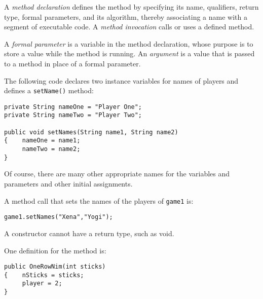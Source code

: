 \secANSH
\begin{ANS}
\item  A {\it method declaration} defines the method by specifying
its name, qualifiers, return type, formal parameters, and
its algorithm, thereby associating a name with a segment
of executable code.  A {\it method invocation} calls or
uses a defined method.


\item  A {\it formal parameter} is a variable in the method declaration,
whose purpose is to store a value while the method is running.  An
{\it argument} is a value that is passed to a method in place of a
formal parameter.


\item  The following code declares two instance variables for names
of players  and defines a {\tt setName()} method:

\begin{jjjlisting}
\begin{lstlisting}
private String nameOne = "Player One";
private String nameTwo = "Player Two";

public void setNames(String name1, String name2)
{    nameOne = name1;
     nameTwo = name2;
}
\end{lstlisting}
\end{jjjlisting}

\noindent Of course, there are many other appropriate names for
the variables and parameters and other initial assignments.

\item A method call that sets the names of the players of {\tt game1} is:

\begin{jjjlisting}
\begin{lstlisting}
game1.setNames("Xena","Yogi");
\end{lstlisting}
\end{jjjlisting}

\item  A constructor cannot have a return type, such as void.

\item  One definition for the method is:

\begin{jjjlisting}
\begin{lstlisting}
public OneRowNim(int sticks)
{    nSticks = sticks;
     player = 2;
}
\end{lstlisting}
\end{jjjlisting}


\end{ANS}
